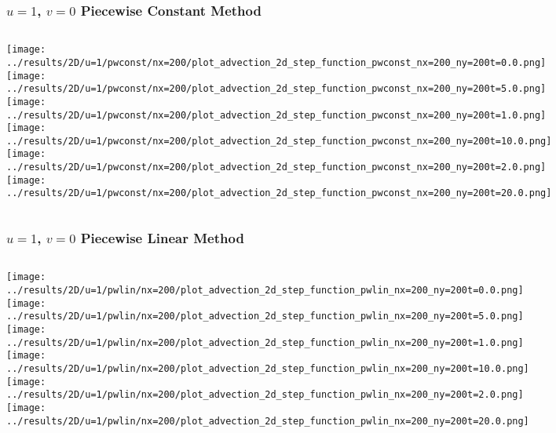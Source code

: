 \begin{frame}
	\frametitle{$u = 1$, $v = 0$ Piecewise Constant Method}
	\begin{columns}
		\centering
		\texttt{[image: ../results/2D/u=1/pwconst/nx=200/plot\_advection\_2d\_step\_function\_pwconst\_nx=200\_ny=200t=0.0.png]}\\
		\texttt{[image: ../results/2D/u=1/pwconst/nx=200/plot\_advection\_2d\_step\_function\_pwconst\_nx=200\_ny=200t=5.0.png]}
		\centering
		\texttt{[image: ../results/2D/u=1/pwconst/nx=200/plot\_advection\_2d\_step\_function\_pwconst\_nx=200\_ny=200t=1.0.png]}\\
		\texttt{[image: ../results/2D/u=1/pwconst/nx=200/plot\_advection\_2d\_step\_function\_pwconst\_nx=200\_ny=200t=10.0.png]}
		\centering
		\texttt{[image: ../results/2D/u=1/pwconst/nx=200/plot\_advection\_2d\_step\_function\_pwconst\_nx=200\_ny=200t=2.0.png]}\\
		\texttt{[image: ../results/2D/u=1/pwconst/nx=200/plot\_advection\_2d\_step\_function\_pwconst\_nx=200\_ny=200t=20.0.png]}
	\end{columns}
\end{frame}


\begin{frame}
	\frametitle{$u = 1$, $v = 0$ Piecewise Linear Method}
	\begin{columns}
		\column{.33\textwidth}
			\centering
			\texttt{[image: ../results/2D/u=1/pwlin/nx=200/plot\_advection\_2d\_step\_function\_pwlin\_nx=200\_ny=200t=0.0.png]}\\
			\texttt{[image: ../results/2D/u=1/pwlin/nx=200/plot\_advection\_2d\_step\_function\_pwlin\_nx=200\_ny=200t=5.0.png]}
		\column{.33\textwidth}
			\centering
			\texttt{[image: ../results/2D/u=1/pwlin/nx=200/plot\_advection\_2d\_step\_function\_pwlin\_nx=200\_ny=200t=1.0.png]}\\
			\texttt{[image: ../results/2D/u=1/pwlin/nx=200/plot\_advection\_2d\_step\_function\_pwlin\_nx=200\_ny=200t=10.0.png]}
		\column{.33\textwidth}
			\centering
			\texttt{[image: ../results/2D/u=1/pwlin/nx=200/plot\_advection\_2d\_step\_function\_pwlin\_nx=200\_ny=200t=2.0.png]}\\
			\texttt{[image: ../results/2D/u=1/pwlin/nx=200/plot\_advection\_2d\_step\_function\_pwlin\_nx=200\_ny=200t=20.0.png]}
	\end{columns}
\end{frame}


